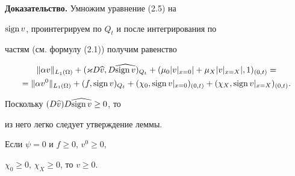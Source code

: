 \documentclass[12pt]{article}
\newcommand{\sign}{\operatornamewithlimits{sign}}
\theoremstyle{plain} %
\newtheorem{lemm}{\hskip\parindent Лемма}[section]
\theoremstyle{definition}
\numberwithin{equation}{section}
\begin{document}
{\bf Доказательство.} Умножим уравнение (2.5) на


$\sign v$, проинтегрируем по $Q_t$ и после интегрирования по


частям (см. формулу (2.1)) получим равенство


\begin{multline*}


\|\alpha v\|_{L_1(\Omega)}+


(\varkappa D\widehat v,D\widehat{\sign v})_{Q_t}


+(\mu_0|v|_{x=0}|+\mu_X|v|_{x=X}|,1)_{(0,t)}=\\


%


= \|\alpha v^0\|_{L_1(\Omega)}+


(f,\sign v)_{Q_t}+(\chi_0,\sign v|_{x=0})_{(0,t)}


+(\chi_X,\sign v|_{x=X})_{(0,t)}.


\end{multline*}


Поскольку $(D\widehat v)D\widehat {\sign v}\ge 0$, то


из него легко следует утверждение леммы.





\begin{lemm} Если $\psi=0$ и $f\ge 0$, $v^0\ge 0$,


$\chi_0\ge 0$, $\chi_X\ge 0$, то $v\ge 0$.


\end{lemm}
\end{document}
